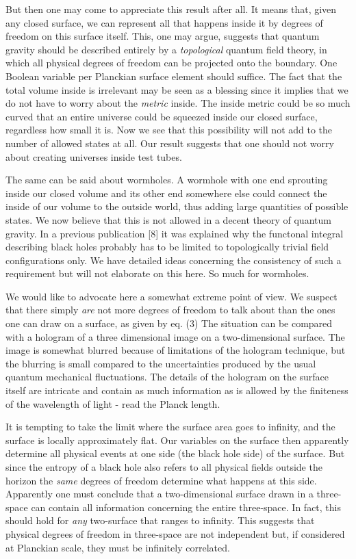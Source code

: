 But then one may come to appreciate this result after all. It means
that, given any closed surface, we can represent all that happens
inside it by degrees of freedom on this surface itself. This, one may
argue, suggests that quantum gravity should be described entirely by a
{\it topological} quantum field theory, in which all physical degrees
of freedom can be projected onto the boundary. One Boolean
variable per Planckian surface element should suffice. The fact that
the total volume inside is irrelevant may be seen as a blessing since
it implies that we do not have to worry about the {\it metric} inside.
The inside metric could be so much curved that an entire universe could
be squeezed inside our closed surface, regardless how small it is. Now
we see that this possibility will not add to the number of allowed
states at all. Our result suggests that one should not worry about
creating universes inside test tubes.

The same can be said about wormholes. A wormhole with one end sprouting
inside our closed volume and its other end somewhere else could connect
the inside of our volume to the outside world, thus adding large
quantities of possible states. We now believe that this is not allowed
in a decent theory of quantum gravity. In a previous publication [8] it
was explained why the functonal integral describing black holes
probably has to be limited to topologically trivial field
configurations only. We have detailed ideas concerning the consistency
of such a requirement but will not elaborate on this here. So much for
wormholes.

We would like to advocate here a somewhat extreme point of view. We
suspect that there simply {\it are} not more degrees of freedom to talk
about than the ones one can draw on a surface, as given by eq. (3) The
situation can be compared with a hologram of a three dimensional image
on a two-dimensional surface. The image is somewhat blurred because of
limitations of the hologram technique, but the blurring is small
compared to the uncertainties produced by the usual quantum mechanical
fluctuations. The details of the hologram on the surface itself are
intricate and contain as much information as is allowed by the
finiteness of the wavelength of light - read the Planck length.

It is tempting to take the limit where the surface area goes to
infinity, and the surface is locally approximately flat. Our variables on
the surface then apparently determine all physical events at one side (the
black hole side) of the surface. But since the entropy of a black hole
also refers to all physical fields outside the horizon the {\it same}
degrees of freedom determine what happens at this side. Apparently one
must conclude that a two-dimensional surface drawn in a three-space can
contain all information concerning the entire three-space. In fact,
this should hold for {\it any} two-surface that ranges to infinity.
This suggests that physical degrees of freedom in three-space are not
independent but, if considered at Planckian scale, they must be
infinitely correlated.

